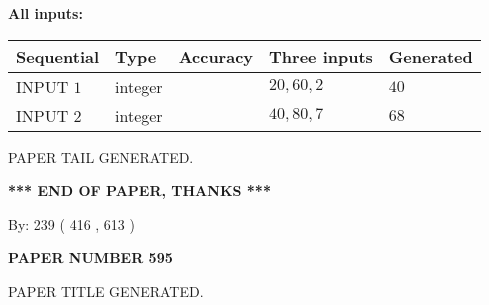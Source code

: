 \documentclass[12pt]{article}
\begin{document}
   
   
   
\noindent\vspace{0.1in}\hspace{-0.08in} {\textbf{\Large{All inputs: }}}
   
   
  
  
\noindent\begin{tabular}{|l|l|l|l|l|}
\hline
 Sequential & Type & Accuracy & Three inputs & Generated \\ 
\hline
 
 
  INPUT $  1 $ & integer &  & $
 20
 , 
 60
 , 
 2
 $ & $ 40 $ 
 \\  \hline  
 
 
  INPUT $  2 $ & integer &  & $
 40
 , 
 80
 , 
 7
 $ & $ 68 $ 
 \\  \hline  
 \end{tabular}
   
   
   
   
   
   
 \vspace{0.2in}
 
   
   
\vspace{2.0in} PAPER TAIL GENERATED.
   
   
   
   
\vspace{1.0in} 
{\textbf{\large{ *** END OF PAPER, THANKS *** }}} 
   
   
\hspace{1.0in} By: 
 239 ( 416 ,  613 )
   
   
   
   
\newpage 
\setcounter{page}{ 
   595001 } 
   
   
   
   
 {\textbf{ \Large{ PAPER NUMBER  595  }}}
   
   
\vspace{0.2in}
   
   
   
   
   
   
   
   
 \vspace{0.2in}
 
 
 
 
   
   
 PAPER TITLE GENERATED.
   
   
   
\vspace{0.2in}
   
\end{document}
